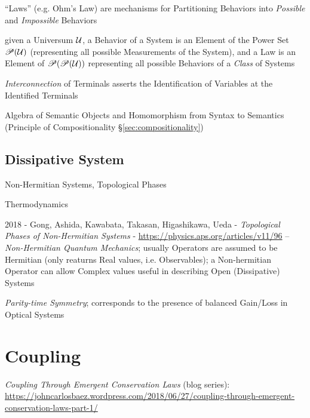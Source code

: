 
``Laws'' (e.g. Ohm's Law) are mechanisms for Partitioning Behaviors
into \emph{Possible} and \emph{Impossible} Behaviors

given a Universum $\mathcal{U}$, a Behavior of a System is an Element
of the Power Set $\mathscr{P}(\mathcal{U})$ (representing all possible
Measurements of the System), and a Law is an Element of
$\mathscr{P}(\mathscr{P}(\mathcal{U}))$ representing all possible Behaviors of a
\emph{Class} of Systems

\emph{Interconnection} of Terminals asserts the Identification of
Variables at the Identified Terminals

Algebra of Semantic Objects and Homomorphism from Syntax to Semantics
(Principle of Compositionality \S\ref{sec:compositionality})



\subsection{Dissipative System}\label{sec:dissipative_system}

Non-Hermitian Systems, Topological Phases

Thermodynamics

2018 - Gong, Ashida, Kawabata, Takasan, Higashikawa, Ueda -
\emph{Topological Phases of Non-Hermitian Systems} -
\url{https://physics.aps.org/articles/v11/96}
-- \emph{Non-Hermitian Quantum Mechanics}; usually Operators are assumed to be
Hermitian (only reaturns Real values, i.e. Observables); a Non-hermitian
Operator can allow Complex values useful in describing Open (Dissipative)
Systems

\emph{Parity-time Symmetry}; corresponds to the presence of balanced Gain/Loss
in Optical Systems



\section{Coupling}\label{sec:coupling}

\emph{Coupling Through Emergent Conservation Laws} (blog series):
\url{https://johncarlosbaez.wordpress.com/2018/06/27/coupling-through-emergent-conservation-laws-part-1/}

